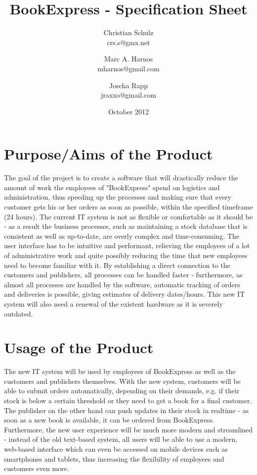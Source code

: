 \documentclass[a4paper,draft]{article}
\author{Christian Schulz\\crs.s@gmx.net \and Marc A. Harnos\\mharnos@gmail.com \and Joscha Rapp\\jraxxo@gmail.com}
\begin{document}
\title{BookExpress - Specification Sheet}
\date{October 2012}
\maketitle
\clearpage
\tableofcontents
\clearpage

\section{Purpose/Aims of the Product}
The goal of the project is to create a software that will drastically reduce the amount of work the employees of "BookExpress" spend on logistics and administration, thus speeding up the processes and making sure that every customer gets his or her orders as soon as possible, within the specified timeframe (24 hours). The current IT system is not as flexible or comfortable as it should be - as a result the business processes, such as maintaining a stock database that is consistent as well as up-to-date, are overly complex and time-consuming. The user interface has to be intuitive and performant, relieving the employees of a lot of administrative work and quite possibly reducing the time that new employees need to become familiar with it. By establishing a direct connection to the customers and publishers, all processes can be handled faster - furthermore, as almost all processes are handled by the software, automatic tracking of orders and deliveries is possible, giving estimates of delivery dates/hours. This new IT system will also need a renewal of the existent hardware as it is severely outdated. 
\\
\section{Usage of the Product}
The new IT system will be used by employees of BookExpress as well as the customers and publishers themselves. With the new system, customers will be able to submit orders automatically, depending on their demands, e.g. if their stock is below a certain threshold or they need to get a book for a final customer. The publisher on the other hand can push updates in their stock in realtime - as soon as a new book is available, it can be ordered from BookExpress. Furthermore, the new user experience will be much more modern and streamlined - instead of the old text-based system, all users will be able to use a modern, web-based interface which can even be accessed on mobile devices such as smartphones and tablets, thus increasing the flexibility of employees and customers even more.
\\
\clearpage
\end{document}
